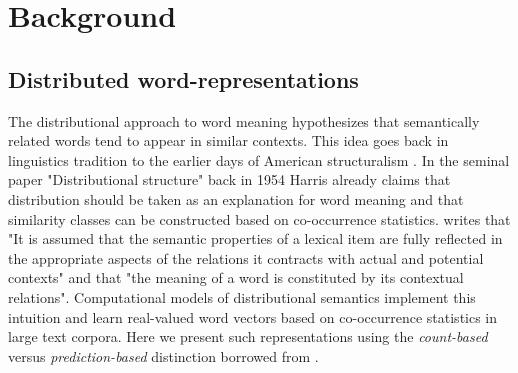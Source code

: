 \begin{comment}
Chapter~\ref{ch:COLI} introduces a recurrent and convolutional neural network
based model that learns from both visual-grounding signals and
word-word co-occurrences. We develop techniques to interpret the learned
representations of such an architecture and investigate if certain linguistic
phenomena is encoded in the learned model.

Chapter~\ref{ch:IJCNLP} provides empirical evidence that grounded learning
can improve machine translation quality.
In Chapter~\ref{ch:ConLL} we show under what conditions multilinguality an help improve grounded
representations.


\end{comment}

\chapter{Background}
\label{ch:background}

\section{Distributed word-representations}
\label{sec:words}
The distributional approach to word meaning hypothesizes that semantically related words
tend to appear in similar contexts. This idea goes back in linguistics tradition to the
earlier days of American structuralism \citep{nevin2002legacy}. In the seminal paper
"Distributional structure" \citep{harris1954distributional} back in 1954 Harris already claims
that distribution should be taken as an explanation for word meaning and that similarity classes
can be constructed based on co-occurrence statistics.
\cite{cruse1986lexical} writes that "It is  assumed  that  the  semantic properties  of
a lexical  item  are  fully  reflected  in  the  appropriate  aspects  of  the  relations
it  contracts  with  actual  and  potential  contexts" and that "the  meaning  of  a word
is constituted  by  its  contextual  relations". Computational models of distributional
semantics implement this intuition and learn real-valued word vectors based on co-occurrence
statistics in large text corpora. 
Here we present such representations using the \emph{count-based}
versus \emph{prediction-based} distinction borrowed from \cite{baroni2014don}.

